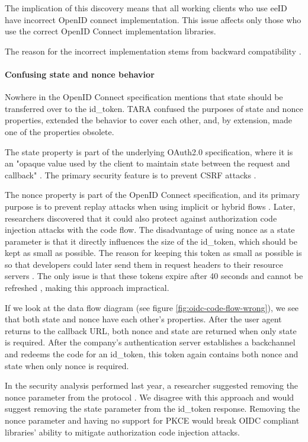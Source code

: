 The implication of this discovery means that all working clients who use eeID have incorrect OpenID connect implementation. This issue affects only those who use the correct OpenID Connect implementation libraries.

The reason for the incorrect implementation stems from backward compatibility \cite{tara-non-oidc-compliant}.

\paragraph{Confusing state and nonce behavior}

Nowhere in the OpenID Connect specification mentions that state should be transferred over to the id\_token. TARA confused the purposes of state and nonce properties, extended the behavior to cover each other, and, by extension, made one of the properties obsolete.

The state property is part of the underlying OAuth2.0 specification, where it is an "opaque value used by the client to maintain state between the request and callback" \cite{rfc6749}. The primary security feature is to prevent CSRF attacks \cite{rfc6749,ietf-oauth-security-topics-19}.

The nonce property is part of the OpenID Connect specification, and its primary purpose is to prevent replay attacks when using implicit or hybrid flows \cite{oidc}. Later, researchers discovered that it could also protect against authorization code injection attacks with the code flow. The disadvantage of using {nonce} as a state parameter is that it directly influences the size of the id\_token, which should be kept as small as possible. The reason for keeping this token as small as possible is so that developers could later send them in request headers to their resource servers \cite{rfc7519}. The only issue is that these tokens expire after 40 seconds and cannot be refreshed \cite{tara-technical}, making this approach impractical.

If we look at the data flow diagram (see figure \ref{fig:oidc-code-flow-wrong}), we see that both state and nonce have each other's properties. After the user agent returns to the callback URL, both {nonce} and {state} are returned when only {state} is required. After the company's authentication server establishes a backchannel and redeems the code for an id\_token, this token again contains both {nonce} and {state} when only {nonce} is required.

In the security analysis performed last year, a researcher suggested removing the nonce parameter from the protocol \cite{tara-security-arnis}. We disagree with this approach and would suggest removing the state parameter from the id\_token response. Removing the nonce parameter and having no support for PKCE would break OIDC compliant libraries' ability to mitigate authorization code injection attacks.

